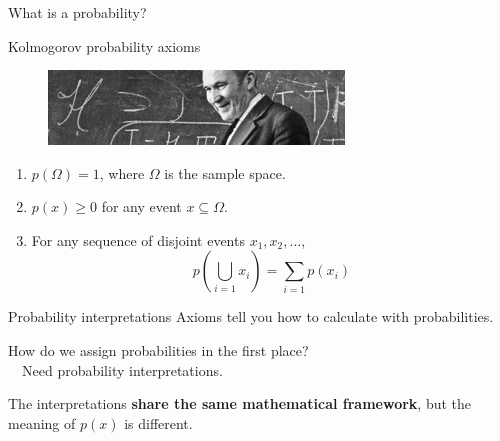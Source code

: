 \documentclass[
aspectratio=169,
14pt,
professionalfonts
]{beamer}
\newcommand{\arrow}{~\ding{220}~}
\begin{document}
\begin{frame}
\centering
\Large
What is a probability?
\end{frame}

\begin{frame}{Kolmogorov probability axioms}
\begin{figure}
    \centering
    \includegraphics[width=0.7\textwidth]{../plots/kolmogorov.jpg}
\end{figure}
\begin{enumerate}
  \item $ p(\Omega) = 1 $, where \( \Omega \) is the sample space.
  \item $ p(x) \geq 0 $ for any event \( x \subseteq \Omega \).
  \item For any sequence of disjoint events \( x_1, x_2, \dots \),
        $$
        p\left( \bigcup_{i=1} x_i \right) = \sum_{i=1} p(x_i)
        $$
\end{enumerate}
\end{frame}




\begin{frame}{Probability interpretations}
    Axioms tell you how to calculate with probabilities.
    
    \vspace{0.5cm}
    How do we assign probabilities in the first place? \\
    \arrow Need probability interpretations.

    \vspace{0.5cm}
    The interpretations \textbf{share the same mathematical framework}, but the meaning of $p(x)$ is different.
\end{frame}
\end{document}
